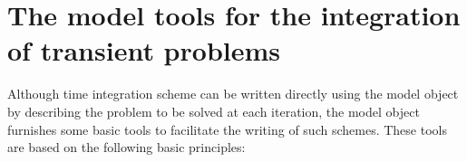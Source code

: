 \documentclass[a4paper,11pt,english]{sphinxmanual}
\begin{document}
\ignorespaces 

\section{The model tools for the integration of transient problems}
\label{\detokenize{userdoc/model_time_integration:the-model-tools-for-the-integration-of-transient-problems}}\label{\detokenize{userdoc/model_time_integration:ud-model-time-integration}}\label{\detokenize{userdoc/model_time_integration:index-0}}\label{\detokenize{userdoc/model_time_integration::doc}}
Although time integration scheme can be written directly using the model object by describing the problem to be solved at each iteration, the model object furnishes some basic tools to facilitate the writing of such schemes. These tools are based on the following basic principles:
\end{document}
